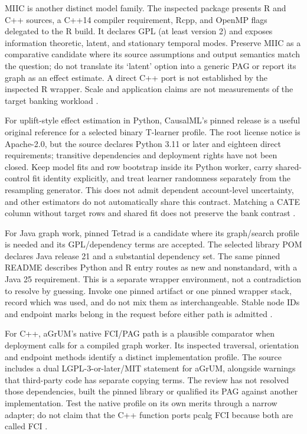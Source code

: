 MIIC is another distinct model family. The inspected package presents R and
C++ sources, a C++14 compiler requirement, Rcpp, and OpenMP flags delegated to
the R build. It declares GPL (at least version 2) and exposes information
theoretic, latent, and stationary temporal modes. Preserve MIIC as a comparative
candidate where its source assumptions and output semantics match the
question; do not translate its `latent' option into a generic PAG or report
its graph as an effect estimate. A direct C++ port is not established by the
inspected R wrapper. Scale and application claims are not measurements of the
target banking workload \citep{exec14_native_miic}.

For uplift-style effect estimation in Python, CausalML's pinned release is a
useful original reference for a selected binary T-learner profile. The root
license notice is Apache-2.0, but the source declares Python 3.11 or later and
eighteen direct requirements; transitive dependencies and deployment rights
have not been closed. Keep model fits and row bootstrap inside its Python
worker, carry shared-control fit identity explicitly, and treat learner
randomness separately from the resampling generator. This does not admit
dependent account-level uncertainty, and other estimators do not automatically
share this contract. Matching a CATE column without target rows and shared fit
does not preserve the bank contrast \citep{exec14_causalml_primary}.

For Java graph work, pinned Tetrad is a candidate where its graph/search profile
is needed and its GPL/dependency terms are accepted. The selected library POM
declares Java release 21 and a substantial dependency set. The same pinned
README describes Python and R entry routes as new and nonstandard, with a Java
25 requirement. This is a separate wrapper environment, not a contradiction
to resolve by guessing. Invoke one pinned artifact or one pinned wrapper stack,
record which was used, and do not mix them as interchangeable. Stable node IDs
and endpoint marks belong in the request before either path is admitted
\citep{exec13_tetrad_reuse_primary,exec14_java_latent_sources}.

For C++, aGrUM's native FCI/PAG path is a plausible comparator when deployment
calls for a compiled graph worker. Its inspected traversal, orientation and
endpoint methods identify a distinct implementation profile. The source
includes a dual LGPL-3-or-later/MIT statement for aGrUM, alongside warnings
that third-party code has separate copying terms. The review has not resolved
those dependencies, built the pinned library or qualified its PAG against
another implementation. Test the native profile on its own merits through a
narrow adapter; do not claim that the C++ function ports pcalg FCI because both
are called FCI \citep{exec14_native_agrum}.

